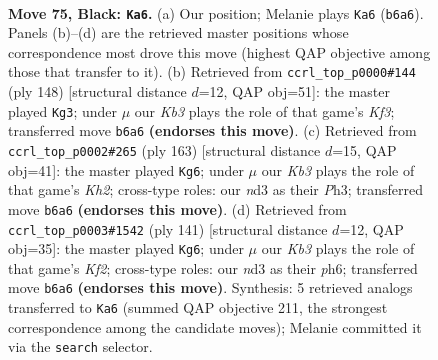 \documentclass[11pt]{article}
\begin{document}
\clearpage

\begin{figure}[p]\centering
\begin{subfigure}{0.46\textwidth}\centering
\resizebox{\linewidth}{!}{%
\newchessgame
\chessboard[
  setfen={8/8/1k6/8/8/3N2K1/1R4P1/3r4 b - - 15 75},
  showmover=false,
  pgfstyle=straightmove, color=movearrow, markmove={b6-a6}
]}
\caption{}
\end{subfigure}\hfill
\begin{subfigure}{0.46\textwidth}\centering
\resizebox{\linewidth}{!}{%
\newchessgame
\chessboard[
  setfen={1R6/5pk1/5r2/8/8/5K2/8/8 w - - 12 75},
  showmover=false,
  pgfstyle=straightmove, color=movearrow, markmove={f3-g3}
]}
\caption{}
\end{subfigure}
\\[4pt]
\begin{subfigure}{0.46\textwidth}\centering
\resizebox{\linewidth}{!}{%
\newchessgame
\chessboard[
  setfen={8/R6k/8/8/6K1/6Pp/8/2r5 b - - 2 82},
  showmover=false,
  pgfstyle=straightmove, color=movearrow, markmove={h7-g6}
]}
\caption{}
\end{subfigure}\hfill
\begin{subfigure}{0.46\textwidth}\centering
\resizebox{\linewidth}{!}{%
\newchessgame
\chessboard[
  setfen={8/5k2/7P/5R2/5PK1/8/8/3r4 b - - 2 71},
  showmover=false,
  pgfstyle=straightmove, color=movearrow, markmove={f7-g6}
]}
\caption{}
\end{subfigure}
\caption{\textbf{Move 75, Black: \texttt{Ka6}.} (a) Our position; Melanie plays \texttt{Ka6} (\texttt{b6a6}). Panels (b)--(d) are the retrieved master positions whose correspondence most drove this move (highest QAP objective among those that transfer to it). (b) Retrieved from \texttt{ccrl\_top\_p0000\#144} (ply 148) [structural distance $d$=12, QAP obj=51]: the master played \texttt{Kg3}; under $\mu$ our \emph{Kb3} plays the role of that game's \emph{Kf3}; transferred move \texttt{b6a6} \textbf{(endorses this move)}. (c) Retrieved from \texttt{ccrl\_top\_p0002\#265} (ply 163) [structural distance $d$=15, QAP obj=41]: the master played \texttt{Kg6}; under $\mu$ our \emph{Kb3} plays the role of that game's \emph{Kh2}; cross-type roles: our \emph{n}d3 as their \emph{P}h3; transferred move \texttt{b6a6} \textbf{(endorses this move)}. (d) Retrieved from \texttt{ccrl\_top\_p0003\#1542} (ply 141) [structural distance $d$=12, QAP obj=35]: the master played \texttt{Kg6}; under $\mu$ our \emph{Kb3} plays the role of that game's \emph{Kf2}; cross-type roles: our \emph{n}d3 as their \emph{p}h6; transferred move \texttt{b6a6} \textbf{(endorses this move)}. Synthesis: 5 retrieved analogs transferred to \texttt{Ka6} (summed QAP objective 211, the strongest correspondence among the candidate moves); Melanie committed it via the \texttt{search} selector.}
\label{fig:thought-m149}
\end{figure}
\end{document}
